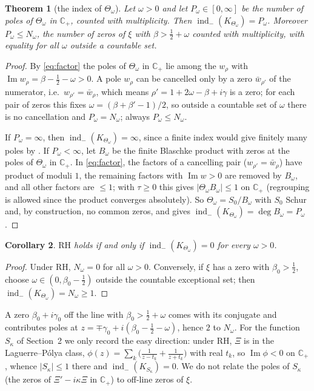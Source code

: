 \documentclass[11pt]{amsart}
\newtheorem{theorem}{Theorem}[section]
\newtheorem{corollary}[theorem]{Corollary}
\theoremstyle{definition}
\theoremstyle{remark}
\newcommand{\RH}{\mathrm{RH}}
\renewcommand{\Im}{\operatorname{Im}}
\newcommand{\half}{\tfrac{1}{2}}
\newcommand{\om}{\omega}
\newcommand{\kap}{\kappa}
\newcommand{\gam}{\gamma}
\newcommand{\C}{\mathbb{C}}
\newcommand{\Xibar}{\Xi}
\newcommand{\Th}{\Theta}
\newcommand{\Sk}{S_\kap}
\newcommand{\indm}{\operatorname{ind}_-}
\begin{document}
\begin{theorem}[the index of $\Th_\om$]\label{thm:kl}
Let $\om>0$ and let $P_\om\in[0,\infty]$ be the number of poles of $\Th_\om$ in $\C_+$, counted
with multiplicity. Then $\indm(K_{\Th_\om})=P_\om$. Moreover $P_\om\le N_\om$, the number of zeros
of $\xi$ with $\beta>\half+\om$ counted with multiplicity, with equality for all $\om$ outside a
countable set.
\end{theorem}
\begin{proof}
By \eqref{eq:factor} the poles of $\Th_\om$ in $\C_+$ lie among the $w_\rho$ with
$\Im w_\rho=\beta-\half-\om>0$. A pole $w_\rho$ can be cancelled only by a zero $\bar w_{\rho'}$ of
the numerator, i.e.\ $w_{\rho'}=\bar w_\rho$, which means $\rho'=1+2\om-\beta+i\gam$ is a zero;
for each pair of zeros this fixes $\om=(\beta+\beta'-1)/2$, so outside a countable set of $\om$
there is no cancellation and $P_\om=N_\om$; always $P_\om\le N_\om$.

If $P_\om=\infty$, then $\indm(K_{\Th_\om})=\infty$, since a finite index would give finitely many
poles by \cite{KL72}. If $P_\om<\infty$, let $B_\om$ be the finite Blaschke product with zeros at the
poles of $\Th_\om$ in $\C_+$. In \eqref{eq:factor}, the factors of a cancelling pair
($w_{\rho'}=\bar w_\rho$) have product of moduli $1$, the remaining factors with $\Im w>0$ are
removed by $B_\om$, and all other factors are $\le1$; with $\tau\ge0$ this gives
$|\Th_\om B_\om|\le1$ on $\C_+$ (regrouping is allowed since the product converges absolutely).
So $\Th_\om=S_0/B_\om$ with $S_0$ Schur and, by construction, no common zeros, and \cite{KL72}
gives $\indm(K_{\Th_\om})=\deg B_\om=P_\om$.
\end{proof}

\begin{corollary}\label{cor:kl}
$\RH$ holds if and only if $\indm(K_{\Th_\om})=0$ for every $\om>0$.
\end{corollary}
\begin{proof}
Under RH, $N_\om=0$ for all $\om>0$. Conversely, if $\xi$ has a zero with $\beta_0>\half$, choose
$\om\in(0,\beta_0-\half)$ outside the countable exceptional set; then
$\indm(K_{\Th_\om})=N_\om\ge1$.
\end{proof}

\noindent A zero $\beta_0+i\gam_0$ off the line with $\beta_0>\half+\om$ comes with its conjugate
and contributes poles at $z=\mp\gam_0+i(\beta_0-\half-\om)$, hence $2$ to $N_\om$. For the function
$\Sk$ of Section~2 we only record the easy direction: under RH, $\Xibar$ is in the
Laguerre--P\'olya class, $\phi(z)=\sum_k\big(\frac1{z-t_k}+\frac1{z+t_k}\big)$ with real $t_k$, so
$\Im\phi<0$ on $\C_+$, whence $|\Sk|\le1$ there and $\indm(K_{\Sk})=0$. We do not relate the poles
of $\Sk$ (the zeros of $\Xibar'-i\kap\Xibar$ in $\C_+$) to off-line zeros of $\xi$.
\end{document}
